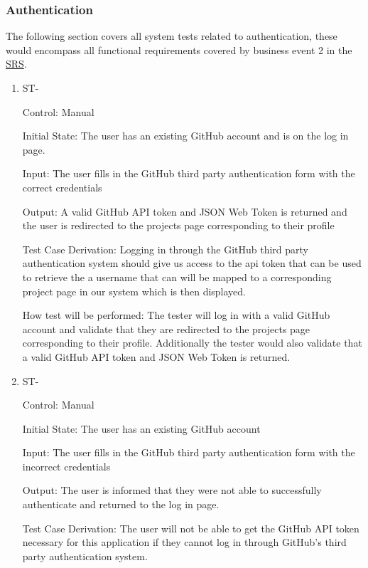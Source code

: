 \documentclass[12pt, titlepage]{article}
\newcounter{TESTID}
\newcommand\TESTNUM{\stepcounter{TESTID}\theTESTID}
\begin{document}
	\subsubsection{Authentication}
	
	The following section covers all system tests related to authentication, these would encompass all functional requirements covered by business event 2 in the \href{https://github.com/RutheniumVI/UnderTree/blob/main/docs/SRS/SRS.pdf}{SRS}.
	
	\begin{enumerate}
		
		\item{ST-\TESTNUM\\}
		
		Control: Manual
		
		Initial State: The user has an existing GitHub account and is on the log in page.
		
		Input: The user fills in the GitHub third party authentication form with the correct credentials
		
		Output: A valid GitHub API token and JSON Web Token is returned and the user is redirected to the projects page corresponding to their profile
		
		Test Case Derivation: Logging in through the GitHub third party authentication system should give us access to the api token that can be used to retrieve the a username that can will be mapped to a corresponding project page in our system which is then displayed.
		
		How test will be performed: The tester will log in with a valid GitHub account and validate that they are redirected to the projects page corresponding to their profile. Additionally the tester would also validate that a valid GitHub API token and JSON Web Token is returned.
		
		\item{ST-\TESTNUM\\}
		
		Control: Manual
		
		Initial State: The user has an existing GitHub account
		
		Input: The user fills in the GitHub third party authentication form with the incorrect credentials
		
		Output: The user is informed that they were not able to successfully authenticate and returned to the log in page.
		
		Test Case Derivation: The user will not be able to get the GitHub API token necessary for this application if they cannot log in through GitHub's third party authentication system.
		

\end{enumerate}
\end{document}
